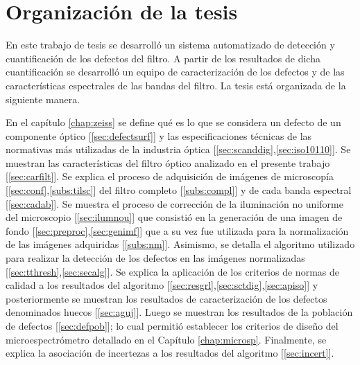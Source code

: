 \singlespacing
\section{Organización de la tesis}

\hspace{0.5cm}En este trabajo de tesis se desarrolló un sistema automatizado de detección y cuantificación de los defectos del filtro. A partir de los resultados de dicha cuantificación se desarrolló un equipo de caracterización de los defectos y de las características espectrales de las bandas del filtro. La tesis está organizada de la siguiente manera.

En el capítulo \ref{chap:zeiss} se define qué es lo que se considera un defecto de un componente óptico [\ref{sec:defectsurf}] y las especificaciones técnicas de las normativas más utilizadas de la industria óptica [\ref{sec:scanddig},\ref{sec:iso10110}]. Se muestran las características del filtro óptico analizado en el presente trabajo [\ref{sec:carfilt}]. Se explica el proceso de adquisición de imágenes de microscopía [\ref{sec:conf},\ref{subs:tilsc}] del filtro completo [\ref{subs:compl}] y de cada banda espectral [\ref{sec:cadab}]. Se muestra el proceso de corrección de la iluminación no uniforme del microscopio [\ref{sec:ilumnou}]  que consistió en la generación de una imagen de fondo [\ref{sec:preproc},\ref{sec:genimf}] que a su vez fue utilizada para la normalización de las imágenes adquiridas [\ref{subs:nm}]. Asimismo, se detalla el algoritmo utilizado para realizar la detección de los defectos en las imágenes normalizadas [\ref{sec:tthresh},\ref{sec:secalg}]. Se explica la aplicación de los criterios de normas de calidad a los resultados del algoritmo [\ref{sec:resgrl},\ref{sec:sctdig},\ref{sec:apiso}] y posteriormente se muestran los resultados de caracterización de los defectos denominados huecos [\ref{sec:aguj}]. Luego se muestran los resultados de la población de defectos [\ref{sec:defpob}]; lo cual permitió establecer los criterios de diseño del microespectrómetro detallado en el Capítulo \ref{chap:microsp}. Finalmente, se explica la asociación de incertezas a los resultados del algoritmo [\ref{sec:incert}].

